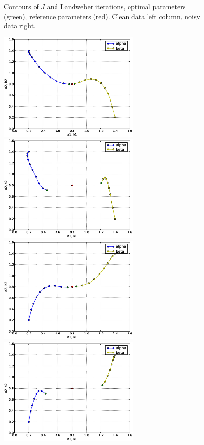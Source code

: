 \begin{figure}
\begin{center}
    \end{center}
  \caption{Contours of $J$ and Landweber iterations, optimal parameters (green), reference parameters (red). 
   Clean data left column, noisy data right. \label{fig2}}
\end{figure}

\begin{figure}
  \begin{center}
    \includegraphics[width=7cm]{chapters/schroll/eps/4Dscan1.eps}
    \includegraphics[width=7cm]{chapters/schroll/eps/4Dscan1-5.eps}
    \includegraphics[width=7cm]{chapters/schroll/eps/4Dscan2.eps}
    \includegraphics[width=7cm]{chapters/schroll/eps/4Dscan2-5.eps}

\end{center}
\end{figure}
